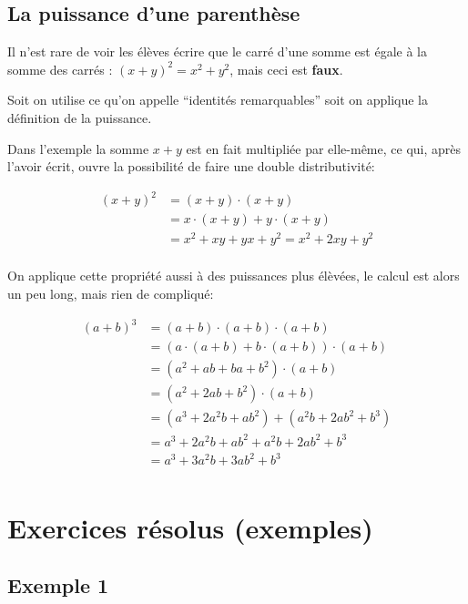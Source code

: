 \documentclass[
  12pt,
]{book}
\begin{document}
\hypertarget{la-puissance-dune-parenthuxe8se}{%
\subsection{La puissance d'une parenthèse}\label{la-puissance-dune-parenthuxe8se}}

Il n'est rare de voir les élèves écrire que le carré d'une somme est égale à la somme des carrés : \((x + y)^2 = x^2 + y^2\), mais ceci est \textbf{faux}.

Soit on utilise ce qu'on appelle ``identités remarquables'' soit on applique la définition de la puissance.

Dans l'exemple la somme \(x+y\) est en fait multipliée par elle-même, ce qui, après l'avoir écrit, ouvre la possibilité de faire une double distributivité:

\begin{align*}
(x+y)^2 & =(x+y)\cdot(x+y)\\
        & =x\cdot(x+y)+y\cdot(x+y)\\
        & =x^2+xy+yx+y^2=x^2+2xy+y^2\\
\end{align*}

On applique cette propriété aussi à des puissances plus élèvées, le calcul est alors un peu long, mais rien de compliqué:

\begin{align*}
(a+b)^3 & =(a+b)\cdot(a+b)\cdot(a+b)\\
        & =(a\cdot(a+b)+b\cdot(a+b))\cdot(a+b)\\
        & =(a^2+ab+ba+b^2)\cdot(a+b)\\
        & =(a^2+2ab+b^2)\cdot(a+b)\\
        & =(a^3+2a^2b+ab^2)+(a^2b+2ab^2+b^3)\\
        & =a^3+2a^2b+ab^2+a^2b+2ab^2+b^3\\
        & =a^3+3a^2b+3ab^2+b^3\\
\end{align*}

\hypertarget{exercices-ruxe9solus-exemples-2}{%
\section{Exercices résolus (exemples)}\label{exercices-ruxe9solus-exemples-2}}

\hypertarget{exemple-1-3}{%
\subsection{Exemple 1}\label{exemple-1-3}}
\end{document}
